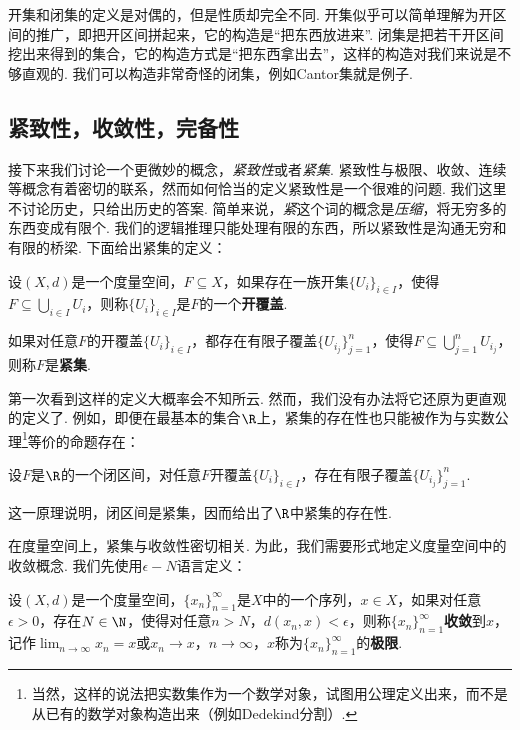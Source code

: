 开集和闭集的定义是对偶的，但是性质却完全不同. 开集似乎可以简单理解为开区间的推广，即把开区间拼起来，它的构造是“把东西放进来”. 闭集是把若干开区间挖出来得到的集合，它的构造方式是“把东西拿出去”，这样的构造对我们来说是不够直观的. 我们可以构造非常奇怪的闭集，例如Cantor集就是例子. 

\subsection{紧致性，收敛性，完备性}

接下来我们讨论一个更微妙的概念，\emph{紧致性}或者\emph{紧集}. 紧致性与极限、收敛、连续等概念有着密切的联系，然而如何恰当的定义紧致性是一个很难的问题. 我们这里不讨论历史，只给出历史的答案. 简单来说，\emph{紧}这个词的概念是\emph{压缩}，将无穷多的东西变成有限个. 我们的逻辑推理只能处理有限的东西，所以紧致性是沟通无穷和有限的桥梁. 下面给出紧集的定义：

\begin{definition}[开覆盖，紧集]
    设$(X,d)$是一个度量空间，$F\subseteq X$，如果存在一族开集$\{U_i\}_{i\in I}$，使得$F\subseteq \bigcup_{i\in I}U_i$，则称$\{U_i\}_{i\in I}$是$F$的一个\textbf{开覆盖}. 
    
    如果对任意$F$的开覆盖$\{U_i\}_{i\in I}$，都存在有限子覆盖$\{U_{i_j}\}_{j=1}^n$，使得$F\subseteq \bigcup_{j=1}^nU_{i_j}$，则称$F$是\textbf{紧集}. 
\end{definition}

第一次看到这样的定义大概率会不知所云. 然而，我们没有办法将它还原为更直观的定义了. 例如，即便在最基本的集合$\R$上，紧集的存在性也只能被作为与实数公理\footnote{当然，这样的说法把实数集作为一个数学对象，试图用公理定义出来，而不是从已有的数学对象构造出来（例如Dedekind分割）. }等价的命题存在：

\begin{proposition}\label{prop:heine-borel}
设$F$是$\R$的一个闭区间，对任意$F$开覆盖$\{U_i\}_{i\in I}$，存在有限子覆盖$\{U_{i_j}\}_{j=1}^n$.
\end{proposition}

这一原理说明，闭区间是紧集，因而给出了$\R$中紧集的存在性. 

在度量空间上，紧集与收敛性密切相关. 为此，我们需要形式地定义度量空间中的收敛概念. 我们先使用$\epsilon-N$语言定义：

\begin{definition}[收敛，极限]
    设$(X,d)$是一个度量空间，$\{x_n\}_{n=1}^\infty$是$X$中的一个序列，$x\in X$，如果对任意$\epsilon>0$，存在$N\in\N$，使得对任意$n>N$，$d(x_n,x)<\epsilon$，则称$\{x_n\}_{n=1}^\infty$\textbf{收敛}到$x$，记作$\lim_{n\to\infty}x_n=x$或$x_n\to x$，$n\to\infty$，$x$称为$\{x_n\}_{n=1}^\infty$的\textbf{极限}. 
\end{definition}

